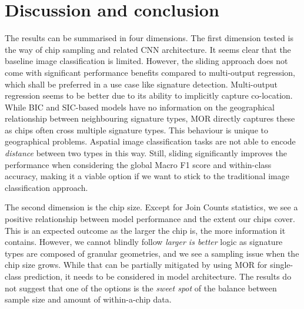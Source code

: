 \section{Discussion and conclusion} %
\label{sec:discussion}

The results can be summarised in four dimensions.
The first dimension tested is the way of chip sampling and related CNN architecture. It
seems clear that the baseline image classification is limited. However, the sliding
approach does not come with significant performance benefits compared to multi-output
regression, which shall be preferred in a use case like signature detection.
Multi-output regression seems to be better due to its ability to implicitly capture
co-location. While BIC and SIC-based models have no information on the geographical
relationship between neighbouring signature types, MOR directly captures these as chips
often cross multiple signature types. This behaviour is unique to geographical problems.
Aspatial image classification tasks are not able to encode \textit{distance} between two
types in this way. Still, sliding significantly improves the performance when
considering the global Macro F1 score and within-class accuracy, making it a viable
option if we want to stick to the traditional image classification approach.

The second dimension is the chip size. Except for Join Counts statistics, we see a positive
relationship between model performance and the extent our chips cover. This is an expected
outcome as the larger the chip is, the more information it contains. However, we cannot
blindly follow \textit{larger is better} logic as signature types are composed of
granular geometries, and we see a sampling issue when the chip size grows. While that
can be partially mitigated by using MOR for single-class prediction, it needs to be considered in model
architecture. The results do not suggest that one of the options is the \textit{sweet spot}
of the balance between sample size and amount of within-a-chip data.

